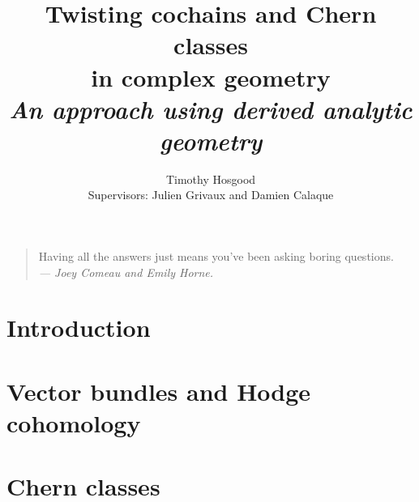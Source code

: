 \documentclass[11pt,twoside]{article}
\title{Twisting cochains and Chern classes\\in complex geometry\\\textit{\Large An approach using derived analytic geometry}}
\author{Timothy Hosgood\\Supervisors: Julien Grivaux and Damien Calaque}
\numberwithin{equation}{subsection}
\numberwithin{theorem}{subsection}
\numberwithin{lemma}{subsection}
\numberwithin{corollary}{subsection}
\numberwithin{definition}{subsection}
\numberwithin{example}{subsection}
\numberwithin{note}{subsection}
\begin{document}
    \maketitle
    \thispagestyle{fancy}
    

    



    \tableofcontents

    \vspace{4em}

    \begin{quote}
        Having all the answers just means you've been asking boring questions.\\
        \emph{--- Joey Comeau and Emily Horne.}
    \end{quote}


    \newpage
    \part{Introduction} %
    \label{prt:introduction}

        
    



    \newpage
    \part{Vector bundles and Hodge cohomology} %
    \label{prt:vector_bundles_de_rham}
    
        




    \newpage
    \part{Chern classes} %
    \label{prt:chern_classes}

        
    
\end{document}
